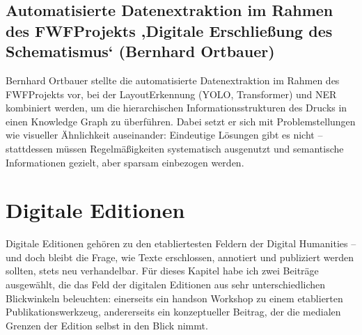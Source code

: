 \documentclass[letterpaper,10pt,english]{jupyterBook}
\begin{document}
\section{Automatisierte Datenextraktion im Rahmen des FWF\sphinxhyphen{}Projekts ‚Digitale Erschließung des Schematismus‘ (Bernhard Ortbauer)}
\label{\detokenize{tagung/machine-learning:automatisierte-datenextraktion-im-rahmen-des-fwf-projekts-digitale-erschlieszung-des-schematismus-bernhard-ortbauer}}
\sphinxAtStartPar
Bernhard Ortbauer stellte die automatisierte Datenextraktion im Rahmen des FWF\sphinxhyphen{}Projekts  vor, bei der Layout\sphinxhyphen{}Erkennung (YOLO, Transformer) und NER kombiniert werden, um die hierarchischen Informationsstrukturen des Drucks in einen Knowledge Graph zu überführen. Dabei setzt er sich mit Problemstellungen wie visueller Ähnlichkeit auseinander: Eindeutige Lösungen gibt es nicht – stattdessen müssen Regelmäßigkeiten systematisch ausgenutzt und semantische Informationen gezielt, aber sparsam einbezogen werden.

\sphinxstepscope


\chapter{Digitale Editionen}
\label{\detokenize{tagung/digitale-editionen:digitale-editionen}}\label{\detokenize{tagung/digitale-editionen::doc}}
\sphinxAtStartPar
Digitale Editionen gehören zu den etabliertesten Feldern der Digital Humanities – und doch bleibt die Frage, wie Texte erschlossen, annotiert und publiziert werden sollten, stets neu verhandelbar. Für dieses Kapitel habe ich zwei Beiträge ausgewählt, die das Feld der digitalen Editionen aus sehr unterschiedlichen Blickwinkeln beleuchten: einerseits ein hands\sphinxhyphen{}on Workshop zu einem etablierten Publikationswerkzeug, andererseits ein konzeptueller Beitrag, der die medialen Grenzen der Edition selbst in den Blick nimmt.
\end{document}

